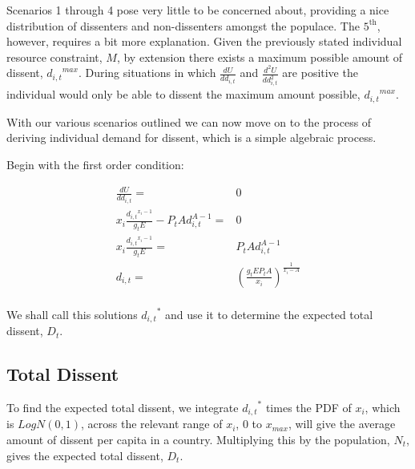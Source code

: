 \documentclass[12pt]{article}
\begin{document}
\begin{spacing}{1.5}
Scenarios 1 through 4 pose very little to be concerned about, providing a nice distribution of dissenters and non-dissenters amongst the populace. The $\text{5}^{\text{th}}$, however, requires a bit more explanation. Given the previously stated individual resource constraint, $M$, by extension there exists a maximum possible amount of dissent, ${d_{i,t}}^{max}$. During situations in which $\frac{dU}{dd_{i,t}}$ and $\frac{d^2U}{dd_{i,t}^2}$ are positive the individual would only be able to dissent the maximum amount possible, ${d_{i,t}}^{max}$.  



With our various scenarios outlined we can now move on to the process of deriving individual demand for dissent, which is a simple algebraic process. 

\vspace{1 em}
\noindent Begin with the first order condition: 

\begin{equation}
	\begin{aligned}
\frac{dU}{dd_{i,t}}=& 0\\ 
x_i \frac{{d_{i,t}}^{x_i -1}}{g_t E} - P_t Ad_{i,t}^{A-1}=& 0 \\
	x_i \frac{{d_{i,t}}^{x_i -1}}{g_t E} =& P_t Ad_{i,t}^{A-1}\\
		d_{i,t}=& \left(\frac{g_tEP_t A}{x_i} \right)^{\frac{1}{x_i -A}}\\ 	
	\end{aligned}
\end{equation}

We shall call this solutions ${d_{i,t}}^*$ and use it to determine the expected total dissent, $D_t$. 

   
\subsection{Total Dissent}

 
To find the expected total dissent, we integrate ${d_{i,t}}^*$ times the PDF of $x_i$, which is $LogN(0,1)$, across the relevant range of $x_i$, $0$ to $x_{max}$, will give the average amount of dissent per capita in a country. Multiplying this by the population, $N_t$, gives the expected total dissent, $D_t$.


\end{spacing}
\end{document}
